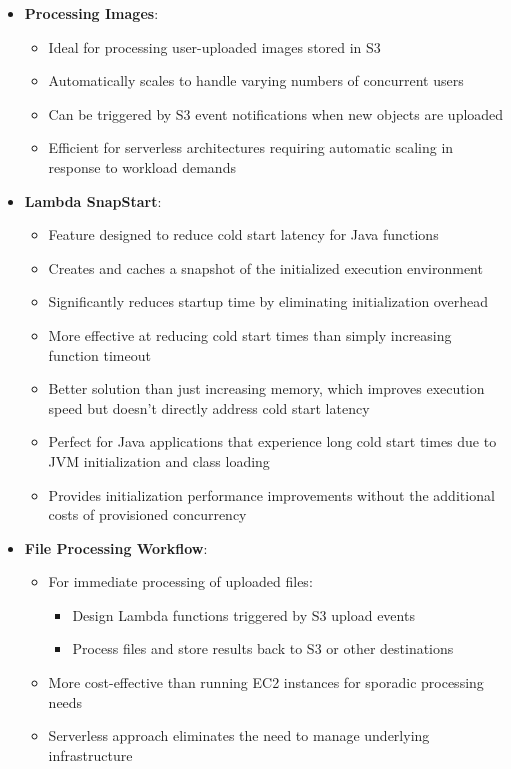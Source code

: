 \documentclass[11pt,a4paper]{report}
\begin{document}
\begin{itemize}
\begin{itemize}
\end{itemize}
  \item \textbf{Processing Images}:
\begin{itemize}
  \item Ideal for processing user-uploaded images stored in S3
  \item Automatically scales to handle varying numbers of concurrent users
  \item Can be triggered by S3 event notifications when new objects are uploaded
  \item Efficient for serverless architectures requiring automatic scaling in response to workload demands
\end{itemize}
  \item \textbf{Lambda SnapStart}:
\begin{itemize}
  \item Feature designed to reduce cold start latency for Java functions
  \item Creates and caches a snapshot of the initialized execution environment
  \item Significantly reduces startup time by eliminating initialization overhead
  \item More effective at reducing cold start times than simply increasing function timeout
  \item Better solution than just increasing memory, which improves execution speed but doesn't directly address cold start latency
  \item Perfect for Java applications that experience long cold start times due to JVM initialization and class loading
  \item Provides initialization performance improvements without the additional costs of provisioned concurrency
\end{itemize}
  \item \textbf{File Processing Workflow}:
\begin{itemize}
  \item For immediate processing of uploaded files:
\begin{itemize}
  \item Design Lambda functions triggered by S3 upload events
  \item Process files and store results back to S3 or other destinations
\end{itemize}
  \item More cost-effective than running EC2 instances for sporadic processing needs
  \item Serverless approach eliminates the need to manage underlying infrastructure

\end{itemize}
\end{itemize}
\end{document}
